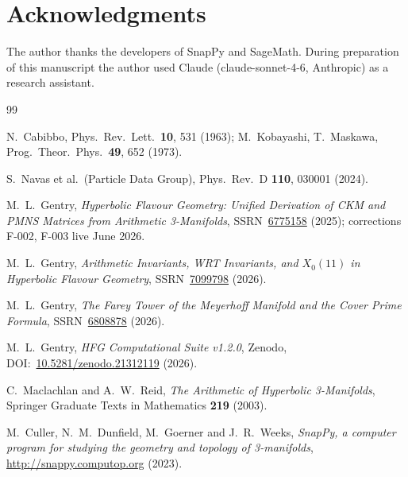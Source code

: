 \documentclass[11pt,a4paper]{article}
\theoremstyle{remark}
\begin{document}
\section*{Acknowledgments}
The author thanks the developers of SnapPy and SageMath.
During preparation of this manuscript the author used Claude
(claude-sonnet-4-6, Anthropic) as a research assistant.

\begin{thebibliography}{99}

  N.~Cabibbo, Phys.\ Rev.\ Lett.\ \textbf{10}, 531 (1963);
  M.~Kobayashi, T.~Maskawa, Prog.\ Theor.\ Phys.\ \textbf{49}, 652 (1973).

  S.~Navas et al.\ (Particle Data Group),
  Phys.\ Rev.\ D \textbf{110}, 030001 (2024).

  M.~L.~Gentry,
  \textit{Hyperbolic Flavour Geometry: Unified Derivation of CKM and PMNS
  Matrices from Arithmetic 3-Manifolds},
  SSRN~\href{https://doi.org/10.2139/ssrn.6775158}{6775158} (2025);
  corrections F-002, F-003 live June 2026.

  M.~L.~Gentry,
  \textit{Arithmetic Invariants, WRT Invariants, and $X_0(11)$ in
  Hyperbolic Flavour Geometry},
  SSRN~\href{https://doi.org/10.2139/ssrn.7099798}{7099798} (2026).

  M.~L.~Gentry,
  \textit{The Farey Tower of the Meyerhoff Manifold and the Cover
  Prime Formula},
  SSRN~\href{https://doi.org/10.2139/ssrn.6808878}{6808878} (2026).

  M.~L.~Gentry,
  \textit{HFG Computational Suite v1.2.0},
  Zenodo, DOI:~\href{https://doi.org/10.5281/zenodo.21312119}{10.5281/zenodo.21312119}
  (2026).

  C.~Maclachlan and A.~W.~Reid,
  \emph{The Arithmetic of Hyperbolic 3-Manifolds},
  Springer Graduate Texts in Mathematics \textbf{219} (2003).

  M.~Culler, N.~M.~Dunfield, M.~Goerner and J.~R.~Weeks,
  \textit{SnapPy, a computer program for studying the geometry and
  topology of 3-manifolds},
  \url{http://snappy.computop.org} (2023).

\end{thebibliography}
\end{document}
